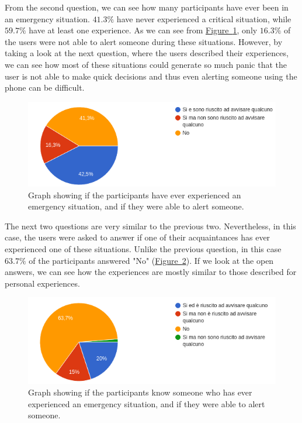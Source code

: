 \documentclass[12pt]{article}
\begin{document}
From the second question, we can see how many participants have ever 
been in an emergency situation. $41.3\%$ have never experienced a 
critical situation, while $59.7\%$ have at least one experience. 
As we can see from \hyperref[fig:emergency_user]{Figure~\ref*{fig:emergency_user}},
only $16.3\%$ of the users were not able to alert someone during these 
situations. However, by taking a look at the next question, where the users 
described their experiences, we can see how most of these situations 
could generate so much panic that the user is not able to make quick 
decisions and thus even alerting someone using the phone can be difficult.

\begin{figure}[ht]
    \centering
    \includegraphics[width=.7\textwidth]{Images/emergency_user.png}
    \caption{Graph showing if the participants have ever experienced
    an emergency situation, and if they were able to alert someone.}
    \label{fig:emergency_user}
\end{figure}

The next two questions are very similar to the previous two. Nevertheless, 
in this case, the users were asked to answer if one of their acquaintances
has ever experienced one of these situations. Unlike the previous 
question, in this case $63.7\%$ of the participants answered 
"No" (\hyperref[fig:emergency_acquaintances]{Figure~\ref*{fig:emergency_acquaintances}}). 
If we look at the open answers, we can see how the experiences
are mostly similar to those described for personal experiences.

\begin{figure}[ht]
    \centering
    \includegraphics[width=.7\textwidth]{Images/emergency_acquaintances.png}
    \caption{Graph showing if the participants know someone who has ever 
    experienced an emergency situation, and if they were able to alert 
    someone.}
    \label{fig:emergency_acquaintances}
\end{figure}
\end{document}
